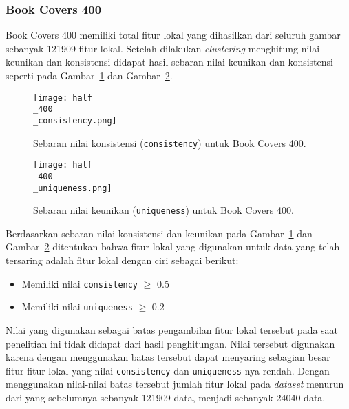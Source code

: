 \subsubsection{Book Covers 400}
Book Covers 400 memiliki total fitur lokal yang dihasilkan dari seluruh gambar sebanyak 121909 fitur lokal. Setelah dilakukan \textit{clustering} menghitung nilai keunikan dan konsistensi didapat hasil sebaran nilai keunikan dan konsistensi seperti pada Gambar~\ref{fig:half_400_consistency} dan Gambar~\ref{fig:half_400_uniqueness}.
\begin{figure}[H]
	\centering
	\texttt{[image: half\\\_400\\\_consistency.png]}
	\caption{Sebaran nilai konsistensi (\texttt{consistency}) untuk Book Covers 400.}
	\label{fig:half_400_consistency}
\end{figure}
\begin{figure}[H]
	\centering
	\texttt{[image: half\\\_400\\\_uniqueness.png]}
	\caption{Sebaran nilai keunikan (\texttt{uniqueness}) untuk Book Covers 400.}
	\label{fig:half_400_uniqueness}
\end{figure}
Berdasarkan sebaran nilai konsistensi dan keunikan pada Gambar~\ref{fig:half_400_consistency} dan Gambar~\ref{fig:half_400_uniqueness} ditentukan bahwa fitur lokal yang digunakan untuk data yang telah tersaring adalah fitur lokal dengan ciri sebagai berikut:
\begin{itemize}
	\item Memiliki nilai \texttt{consistency} $\geq$ 0.5
	\item Memiliki nilai \texttt{uniqueness} $\geq$ 0.2
\end{itemize}
Nilai yang digunakan sebagai batas pengambilan fitur lokal tersebut pada saat penelitian ini tidak didapat dari hasil penghitungan. Nilai tersebut digunakan karena dengan menggunakan batas tersebut dapat menyaring sebagian besar fitur-fitur lokal yang nilai \texttt{consistency} dan \texttt{uniqueness}-nya rendah. Dengan menggunakan nilai-nilai batas tersebut jumlah fitur lokal pada \textit{dataset} menurun dari yang sebelumnya sebanyak 121909 data, menjadi sebanyak 24040 data.

